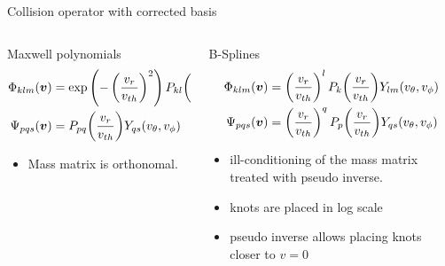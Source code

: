 \documentclass[mathserif, aspectratio=169]{beamer}
\newcommand{\vect}[1]{\boldsymbol{#1}}
\newcommand{\of}[1]{\mleft( #1 \mright)}
\begin{document}
\begin{frame}{Collision operator with corrected basis}
	\begin{columns}
		\begin{column}{0.5\textwidth}
			Maxwell polynomials
			\small
			\begin{align*}
				\Phi_{klm} (\vect{v}) &= \exp\left(-\left(\frac{v_r}{v_{th}}\right) ^ 2\right)  P_{kl}\of{\frac{v_r}{v_{th}}} Y_{lm}(v_\theta,v_\phi) \\
				\Psi_{pqs} (\vect{v}) &= P_{pq}\of{\frac{v_r}{v_{th}}} Y_{qs}(v_\theta,v_\phi)
			\end{align*}
			\begin{itemize}
				\item Mass matrix is orthonomal.  
			\end{itemize}
		\end{column}
		\begin{column}{0.5\textwidth}
			B-Splines 
			\small
			\begin{align*}
			\Phi_{klm} (\vect{v}) &= \left(\frac{v_r}{v_{th}}\right)^l P_k\of{\frac{v_r}{v_{th}}} Y_{lm}(v_\theta,v_\phi) \\
			\Psi_{pqs} (\vect{v}) &= \left(\frac{v_r}{v_{th}}\right)^q P_p\of{\frac{v_r}{v_{th}}} Y_{qs}(v_\theta,v_\phi)
			\end{align*}
			\begin{itemize}
				\item ill-conditioning of the mass matrix treated with pseudo inverse. 
				\item knots are placed in log scale
				\item pseudo inverse allows placing knots closer to $v=0$
			\end{itemize}
		\end{column}
	\end{columns}
\end{frame}
\end{document}
